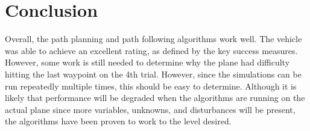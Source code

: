 \documentclass[]{auvsi_doc}
\begin{document}


\section*{Conclusion}

Overall, the path planning and path following algorithms work well. The vehicle was able to achieve an excellent rating, as defined by the key success measures.
However, some work is still needed to determine why the plane had difficulty hitting the last waypoint on the 4th trial. However, since the simulations can be run repeatedly multiple times, this should be easy to determine.
Although it is likely that performance will be degraded when the algorithms are running on the actual plane since more variables, unknowns, and disturbances will be present, the algorithms have been proven to work to the level desired.

\end{document}
